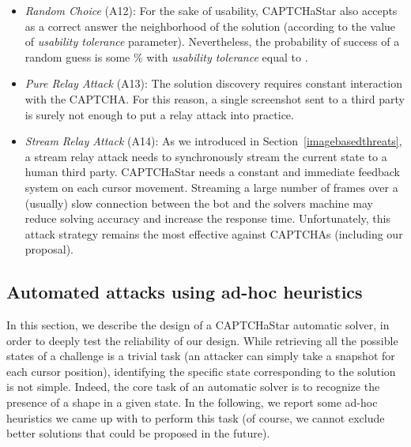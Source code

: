 \documentclass[conference]{IEEEtran}
\begin{document}
\begin{itemize}
\item\textit{Random Choice} (A12): For the sake of usability, CAPTCHaStar also accepts as a correct answer the neighborhood of the solution (according to the value of \textit{usability tolerance} parameter).
Nevertheless, the probability of success of a random guess is some \% with \textit{usability tolerance} equal to .
\item\textit{Pure Relay Attack} (A13): The solution discovery requires constant interaction with the CAPTCHA.
For this reason, a single screenshot sent to a third party is surely not enough to put a relay attack into practice.
\item\textit{Stream Relay Attack} (A14): As we introduced in Section~\ref{imagebasedthreats}, a stream relay attack needs to synchronously stream the current state to a human third party.
CAPTCHaStar needs a constant and immediate feedback system on each cursor movement.
Streaming a large number of frames over a (usually) slow connection between the bot and the solvers machine may reduce solving accuracy and increase the response time.
Unfortunately, this attack strategy remains the most effective against CAPTCHAs (including our proposal).
\end{itemize}

\subsection{Automated attacks using ad-hoc heuristics}
\label{adhocattacks}
In this section, we describe the design of a CAPTCHaStar automatic solver, in order to deeply test the reliability of our design. While retrieving all the possible states of a challenge is a trivial task (an attacker can simply take a snapshot for each cursor position), identifying the specific state corresponding to the solution is not simple. Indeed, the core task of an automatic solver is to recognize the presence of a shape in a given state. In the following, we report some ad-hoc heuristics we came up with to perform this task (of course, we cannot exclude better solutions that could be proposed in the future).
\end{document}
